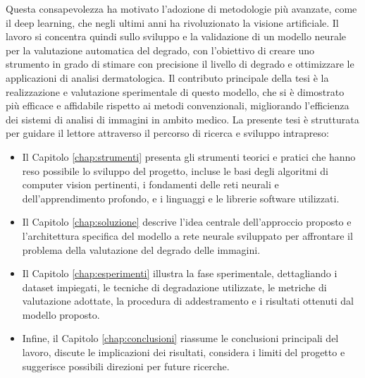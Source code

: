 Questa consapevolezza ha motivato l'adozione di metodologie più avanzate, come il deep learning, che negli ultimi anni ha rivoluzionato la visione artificiale. Il lavoro si concentra quindi sullo sviluppo e la validazione di un modello neurale per la valutazione automatica del degrado, con l'obiettivo di creare uno strumento in grado di stimare con precisione il livello di degrado e ottimizzare le applicazioni di analisi dermatologica. Il contributo principale della tesi è la realizzazione e valutazione sperimentale di questo modello, che si è dimostrato più efficace e affidabile rispetto ai metodi convenzionali, migliorando l'efficienza dei sistemi di analisi di immagini in ambito medico.
La presente tesi è strutturata per guidare il lettore attraverso il percorso di ricerca e sviluppo intrapreso:
\begin{itemize}
    \item Il Capitolo \ref{chap:strumenti} presenta gli strumenti teorici e pratici che hanno reso possibile lo sviluppo del progetto, incluse le basi degli algoritmi di computer vision pertinenti, i fondamenti delle reti neurali e dell'apprendimento profondo, e i linguaggi e le librerie software utilizzati.
    \item Il Capitolo \ref{chap:soluzione} descrive l'idea centrale dell'approccio proposto e l'architettura specifica del modello a rete neurale sviluppato per affrontare il problema della valutazione del degrado delle immagini.
    \item Il Capitolo \ref{chap:esperimenti} illustra la fase sperimentale, dettagliando i dataset impiegati, le tecniche di degradazione utilizzate, le metriche di valutazione adottate, la procedura di addestramento e i risultati ottenuti dal modello proposto.
    \item Infine, il Capitolo \ref{chap:conclusioni} riassume le conclusioni principali del lavoro, discute le implicazioni dei risultati, considera i limiti del progetto e suggerisce possibili direzioni per future ricerche.
\end{itemize}

